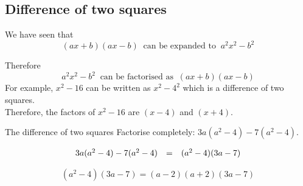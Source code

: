 \subsection* {Difference of two squares}
We have seen that 
\begin{equation*}
(ax+b)(ax-b)~\mbox{ can be expanded to }~{a}^{2}{x}^{2}-{b}^{2}
\end{equation*}

Therefore
\begin{equation*}
{a}^{2}{x}^{2}-{b}^{2}~\mbox{ can be factorised as }~(ax+b)(ax-b)
\end{equation*}
For example, ${x}^{2}-16$ can be written as ${x}^{2}-{4}^{2}$ which is a difference of two squares. 
\\Therefore, the factors of ${x}^{2}-16$ are $(x-4)$ and $(x+4)$.\par 





\begin{wex}{The difference of two squares}
{Factorise completely: $3a(a^2-4)-7(a^2-4)$.}
{


\begin{equation*}
\begin{array}{ccc}\hfill 3a(a^2-4)-7(a^2-4)& =& (a^2-4)(3a-7)\hfill \end{array}
\end{equation*}


$$
(a^2-4)(3a-7) = (a-2)(a+2)(3a-7)
$$

}
\end{wex}


